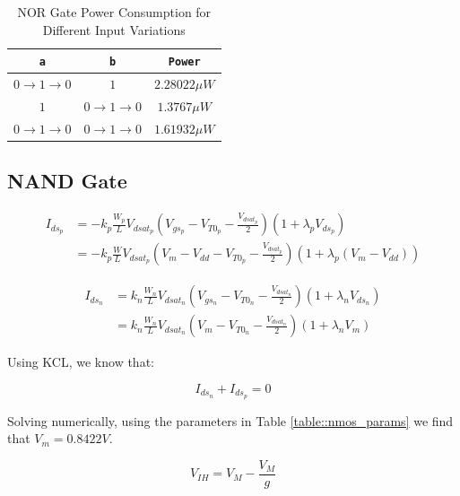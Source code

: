 \documentclass[fleqn]{article}
\begin{document}
	\begin{table}[H]
	\begin{center}
	\caption{NOR Gate Power Consumption for Different Input Variations}
	\label{table::nor_gate_power_analysis}
	\begin{tabular}{| c | c | c |}
		\hline
		\texttt{a} & \texttt{b} & \texttt{Power}\\
		\hline	
		$0 \rightarrow 1 \rightarrow 0$ & $1$ & $2.28022{\mu}W$ \\
		\hline	
		$1$ & $0 \rightarrow 1 \rightarrow 0$ & $1.3767{\mu}W$ \\
		\hline	
		$0 \rightarrow 1 \rightarrow 0$ & $0 \rightarrow 1 \rightarrow 0$ & $1.61932{\mu}W$\\
		\hline
	\end{tabular}
	\end{center}
	\end{table}
	
	\subsection{NAND Gate}

	\begin{align}
		I_{ds_p} &= -k_p\frac{W_p}{L}V_{dsat_p}\left(V_{gs_p} - V_{T0_p} - \frac{V_{dsat_p}}{2}\right)\left(1 + {\lambda_p}V_{ds_p}\right) \\
		&= -k_p\frac{W}{L}V_{dsat_p}\left(V_m - V_{dd} - V_{T0_p} - \frac{V_{dsat_p}}{2}\right)\left(1 + {\lambda_p}(V_m - V_{dd})\right)
	\end{align}
	
	\begin{align}
		I_{ds_n} &= k_n\frac{W_n}{L}V_{dsat_n}\left(V_{gs_n} - V_{T0_n} - \frac{V_{dsat_n}}{2}\right)\left(1 + {\lambda_n}V_{ds_n}\right) \\
		&= k_n\frac{W_n}{L}V_{dsat_n}\left(V_m - V_{T0_n} - \frac{V_{dsat_n}}{2}\right)\left(1 + {\lambda_n}V_m\right)
	\end{align}
	
	Using KCL, we know that:
	
	\begin{equation}
		I_{ds_n} + I_{ds_p} = 0
	\end{equation}
	
	Solving numerically, using the parameters in Table \ref{table::nmos_params} we find that $V_m = 0.8422 V$.
	
	\begin{equation}
		V_{IH} = V_{M} - \frac{V_M}{g}
	\end{equation}
	
\end{document}
